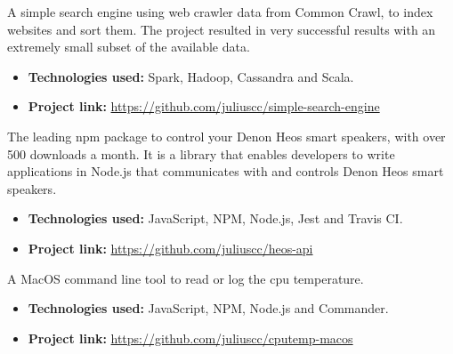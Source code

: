 

A simple search engine using web crawler data from Common Crawl, to index websites and sort them. The project resulted in very successful results with an extremely small subset of the available data.

\vspace{6pt}

\begin{itemize}
    \item \textbf{Technologies used:} Spark, Hadoop, Cassandra and Scala.
    \item \textbf{Project link:} \href{https://github.com/juliuscc/simple-search-engine}{https://github.com/juliuscc/simple-search-engine}
\end{itemize}

\divider

The leading npm package to control your Denon Heos smart speakers, with over 500 downloads a month. It is a library that enables developers to write applications in Node.js that communicates with and controls Denon Heos smart speakers.

\vspace{6pt}

\begin{itemize}
    \item \textbf{Technologies used:} JavaScript, NPM, Node.js, Jest and Travis CI.
    \item \textbf{Project link:} \href{https://github.com/juliuscc/heos-api}{https://github.com/juliuscc/heos-api}
\end{itemize}

\divider

A MacOS command line tool to read or log the cpu temperature.

\vspace{6pt}

\begin{itemize}
    \item \textbf{Technologies used:} JavaScript, NPM, Node.js and Commander.
    \item \textbf{Project link:} \href{https://github.com/juliuscc/cputemp-macos}{https://github.com/juliuscc/cputemp-macos}
\end{itemize}

\divider

